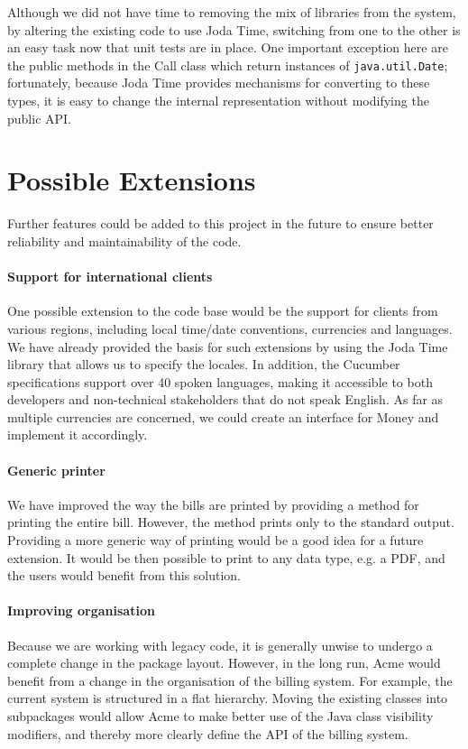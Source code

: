 \documentclass[a4paper]{article}
\begin{document}
Although we did not have time to removing the mix of libraries from the system, by altering the existing code to use Joda Time, switching from one to the other is an easy task now that unit tests are in place. One important exception here are the public methods in the Call class which return instances of  \verb+java.util.Date+; fortunately, because Joda Time provides mechanisms for converting to these types, it is easy to change the internal representation without modifying the public API.

\section{Possible Extensions}

Further features could be added to this project in the future to ensure better reliability and maintainability of the code.

\paragraph{Support for international clients}
One possible extension to the code base would be the support for clients from various regions, including local time/date conventions, currencies and languages. We have already provided the basis for such extensions by using the Joda Time library that allows us to specify the locales. In addition, the Cucumber specifications support over 40 spoken languages, making it accessible to both developers and non-technical stakeholders that do not speak English. As far as multiple currencies are concerned, we could create an interface for Money and implement it accordingly.

\paragraph{Generic printer}
We have improved the way the bills are printed by providing a method for printing the entire bill. However, the method prints only to the standard output. Providing a more generic way of printing would be a good idea for a future extension. It would be then possible to print to any data type, e.g. a PDF, and the users would benefit from this solution.

\paragraph{Improving organisation}
Because we are working with legacy code, it is generally unwise to undergo a complete change in the package layout. However, in the long run, Acme would benefit from a change in the organisation of the billing system. For example, the current system is structured in a flat hierarchy. Moving the existing classes into subpackages would allow Acme to make better use of the Java class visibility modifiers, and thereby more clearly define the API of the billing system.
\end{document}
